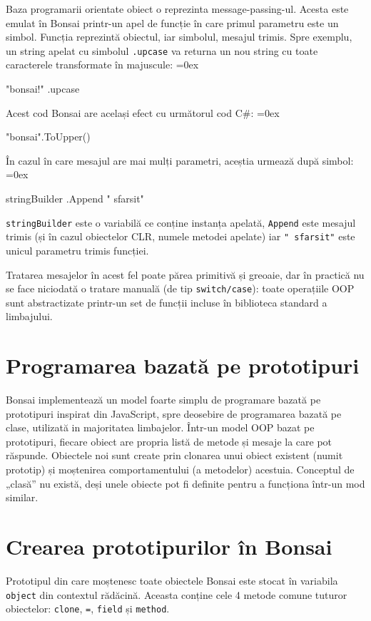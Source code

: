 \documentclass[12pt,a4paper]{memoir}
\renewcommand{\c}{\texttt}
\newenvironment{code}
{
\definecolor{shadecolor}{gray}{0.91}
\topsep=0ex
\relax
\shaded
\verbatim
}
{
\endverbatim
\endshaded
}
\begin{document}
Baza programarii orientate obiect o reprezinta message-passing-ul. Acesta este emulat în Bonsai printr-un apel de funcție în care primul parametru este un simbol. Funcția reprezintă obiectul, iar simbolul, mesajul trimis. Spre exemplu, un string apelat cu simbolul \c{.upcase} va returna un nou string cu toate caracterele transformate în majuscule:
\begin{code}
"bonsai!" .upcase
\end{code}
Acest cod Bonsai are același efect cu următorul cod C\#:
\begin{code}
"bonsai".ToUpper()
\end{code}
În cazul în care mesajul are mai mulți parametri, aceștia urmează după simbol:
\begin{code}
stringBuilder .Append " sfarsit"
\end{code}
\c{stringBuilder} este o variabilă ce conține instanța apelată, \c{Append} este mesajul trimis (și în cazul obiectelor CLR, numele metodei apelate) iar \c{" sfarsit"} este unicul parametru trimis funcției.

Tratarea mesajelor în acest fel poate părea primitivă și greoaie, dar în practică nu se face niciodată o tratare manuală (de tip \texttt{switch/case}): toate operațiile OOP sunt abstractizate printr-un set de funcții incluse în biblioteca standard a limbajului.

\section{Programarea bazată pe prototipuri}

Bonsai implementează un model foarte simplu de programare bazată pe prototipuri\cite{prototype_based_programming} inspirat din JavaScript, spre deosebire de programarea bazată pe clase, utilizată in majoritatea limbajelor. Într-un model OOP bazat pe prototipuri, fiecare obiect are propria listă de metode și mesaje la care pot răspunde. Obiectele noi sunt create prin clonarea unui obiect existent (numit prototip) și moștenirea comportamentului (a metodelor) acestuia. Conceptul de „clasă” nu există, deși unele obiecte pot fi definite pentru a funcționa într-un mod similar. 

\section{Crearea prototipurilor în Bonsai}

Prototipul din care moștenesc toate obiectele Bonsai este stocat în variabila \c{object} din contextul rădăcină. Aceasta conține cele 4 metode comune tuturor obiectelor: \c{clone}, \c{=}, \c{field} și \c{method}.
\end{document}
